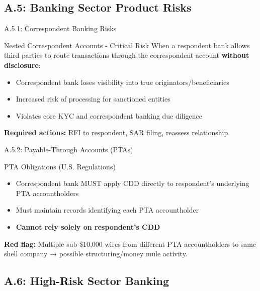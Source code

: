 \documentclass{beamer}
\begin{document}
	\subsection{A.5: Banking Sector Product Risks}
	
	\begin{frame}{A.5.1: Correspondent Banking Risks}
		\begin{block}{Nested Correspondent Accounts - Critical Risk}
			When a respondent bank allows third parties to route transactions through the correspondent account \textbf{without disclosure}:
			\begin{itemize}
				\item Correspondent bank loses visibility into true originators/beneficiaries
				\item Increased risk of processing for sanctioned entities
				\item Violates core KYC and correspondent banking due diligence
			\end{itemize}
		\end{block}
		\textbf{Required actions:} RFI to respondent, SAR filing, reassess relationship.
	\end{frame}
	
	\begin{frame}{A.5.2: Payable-Through Accounts (PTAs)}
		\begin{block}{PTA Obligations (U.S. Regulations)}
			\begin{itemize}
				\item Correspondent bank MUST apply CDD directly to respondent's underlying PTA accountholders
				\item Must maintain records identifying each PTA accountholder
				\item \textbf{Cannot rely solely on respondent's CDD}
			\end{itemize}
		\end{block}
		\textbf{Red flag:} Multiple sub-\$10,000 wires from different PTA accountholders to same shell company → possible structuring/money mule activity.
	\end{frame}
	
	\subsection{A.6: High-Risk Sector Banking}
	
\end{document}
